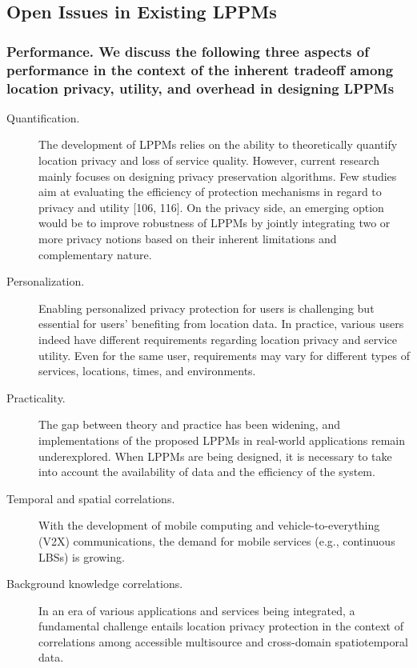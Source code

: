 \documentclass{opticajnl}
\begin{document}
\subsection{Open Issues in Existing LPPMs}
\subsubsection{Performance. We discuss the following three aspects of performance in the context of the inherent tradeoff among location privacy, utility, and overhead in designing LPPMs}
\begin{description}
    
    \item[Quantification.]The development of LPPMs relies on the ability to theoretically quantify location privacy and loss of service quality.  However, current research mainly focuses on designing privacy preservation algorithms. Few studies aim at evaluating the efficiency of protection mechanisms in regard to privacy and utility [106, 116]. On the privacy side, an emerging option would be to improve robustness of LPPMs by jointly integrating two or more privacy notions based on their inherent limitations and complementary nature. 
    \item[Personalization.]Enabling personalized privacy protection for users is challenging but essential for users’ benefiting from location data. In practice, various users indeed have different requirements regarding location privacy and service utility. Even for the same user, requirements may vary for different types of services, locations, times, and environments.
    \item[Practicality.]The gap between theory and practice has been widening, and implementations of the proposed LPPMs in real-world applications remain underexplored. When LPPMs are being designed, it is necessary to take into account the availability of data and the efficiency of the system. 
    \item[Temporal and spatial correlations.]With the development of mobile computing and vehicle-to-everything (V2X) communications, the demand for mobile services (e.g., continuous LBSs) is growing.
    \item[Background knowledge correlations.]In an era of various applications and services being integrated, a fundamental challenge entails location privacy protection in the context of correlations among accessible multisource and cross-domain spatiotemporal data.

\end{description}
\end{document}
